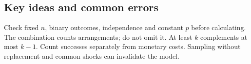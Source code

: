\subsection*{Key ideas and common errors}
Check fixed $n$, binary outcomes, independence and constant $p$ before calculating. The combination counts arrangements; do not omit it. At least $k$ complements at most $k-1$. Count successes separately from monetary costs. Sampling without replacement and common shocks can invalidate the model.
\secInicio

